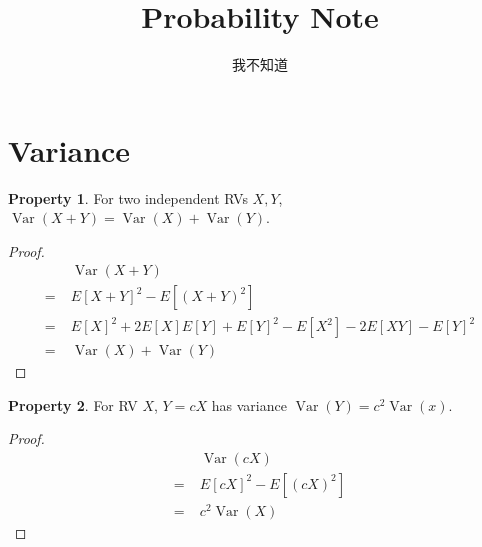 \documentclass[12pt,a4paper,twoside]{article}
\title{Probability \textbf{Note}}
\author{我不知道}
\date{}
\theoremstyle{definition}
\newtheorem{property}{Property}[section]
\theoremstyle{remark}
\newcommand{\Ex}{E}
\DeclareMathOperator{\Var}{Var}
\begin{document}
  	\maketitle
  	\section{Variance}
    \begin{property}
        For two independent RVs $X, Y$, $\Var(X + Y) = \Var(X) + \Var(Y)$.
    \end{property}
    \begin{proof}
    \begin{align*} 
            & \Var(X + Y) \\
        = \; &  \Ex[X + Y]^2 - \Ex[(X + Y)^2] \\
        = \; &  \Ex[X]^2 + 2\Ex[X]\Ex[Y] + \Ex[Y]^2 - \Ex[X^2] - 2\Ex[XY] - \Ex[Y]^2 \\
        = \; & \Var(X) + \Var(Y)
    \end{align*}
    \end{proof}
    \begin{property}
        For RV $X$, $Y = cX$ has variance $\Var(Y) = c^2\Var(x)$.
    \end{property}
    \begin{proof}
        \begin{align*} 
              & \Var(cX) \\
            = \; & \Ex[cX]^2 - \Ex[(cX)^2] \\
            = \; & c^2\Var(X)
        \end{align*}
    \end{proof}
\end{document}
